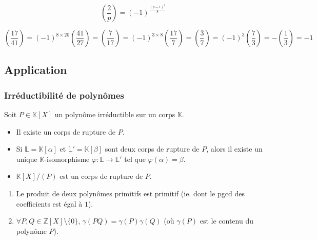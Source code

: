 	\begin{proposition}
		\[ \left( \frac{2}{p} \right) = (-1)^{\frac{(p-1)^2}{8}} \]
	\end{proposition}
	
	\begin{example}
		\[ \left( \frac{17}{41} \right) = (-1)^{8 \times 20} \left( \frac{41}{27} \right) = \left( \frac{7}{17} \right) = (-1)^{3 \times 8} \left( \frac{17}{7} \right) = \left( \frac{3}{7} \right) = (-1)^{3} \left( \frac{7}{3} \right) = - \left( \frac{1}{3} \right) = -1 \]
	\end{example}
	
	\subsection{Application}
	
	\subsubsection{Irréductibilité de polynômes}
	
	
	\begin{theorem}
		Soit $P \in \mathbb{K}[X]$ un polynôme irréductible sur un corps $\mathbb{K}$.
		\begin{itemize}
			\item Il existe un corps de rupture de $P$.
			\item Si $\mathbb{L} = \mathbb{K}[\alpha]$ et $\mathbb{L}' = \mathbb{K}[\beta]$ sont deux corps de rupture de $P$, alors il existe un unique $\mathbb{K}$-isomorphisme $\varphi : \mathbb{L} \rightarrow \mathbb{L}'$ tel que $\varphi(\alpha) = \beta$.
			\item $\mathbb{K}[X]/(P)$ est un corps de rupture de $P$.
		\end{itemize}
	\end{theorem}
	
	
	\begin{lemma}[Gauss]
		\begin{enumerate}[label=(\roman*)]
			\item Le produit de deux polynômes primitifs est primitif (ie. dont le pgcd des coefficients est égal à $1$).
			\item $\forall P, Q \in \mathbb{Z}[X] \setminus \{ 0 \}$, $\gamma(PQ) = \gamma(P) \gamma(Q)$ (où $\gamma(P)$ est le contenu du polynôme $P$).
		\end{enumerate}
	\end{lemma}
	
